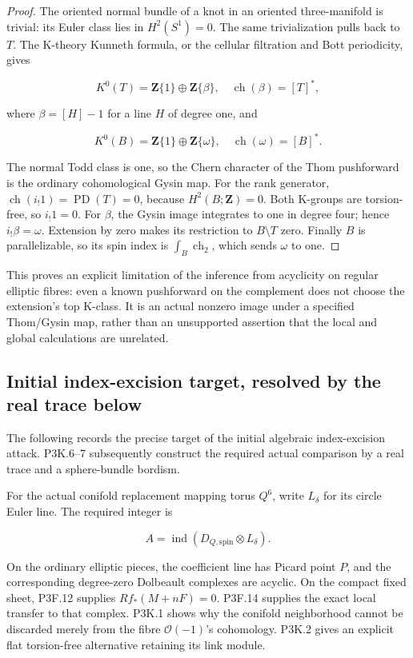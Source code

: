 \begin{proof}
The oriented normal bundle of a knot in an oriented
three-manifold is trivial: its Euler class lies in \(H^2(S^1)=0\).
The same trivialization pulls back to \(T\).  The K-theory Kunneth
formula, or the cellular filtration and Bott periodicity, gives

\[
 K^0(T)=\mathbf Z\{1\}\oplus\mathbf Z\{\beta\},\quad
 \operatorname{ch}(\beta)=[T]^*,
\]

where \(\beta=[H]-1\) for a line \(H\) of degree one, and

\[
 K^0(B)=\mathbf Z\{1\}\oplus\mathbf Z\{\omega\},\quad
 \operatorname{ch}(\omega)=[B]^*.
\]

The normal Todd class is one, so the Chern character of the Thom
pushforward is the ordinary cohomological Gysin map.  For the rank
generator, \(\operatorname{ch}(i_!1)=\operatorname{PD}(T)=0\), because
\(H^2(B;\mathbf Z)=0\).  Both K-groups are torsion-free, so \(i_!1=0\).
For \(\beta\), the Gysin image integrates to one in degree four;
hence \(i_!\beta=\omega\).  Extension by zero makes its restriction
to \(B\setminus T\) zero.  Finally \(B\) is parallelizable, so its
spin index is \(\int_B\operatorname{ch}_2\), which sends \(\omega\)
to one.
\end{proof}

This proves an explicit limitation of the inference from acyclicity
on regular elliptic fibres: even a known pushforward on the complement
does not choose the extension's top K-class.  It is an actual
nonzero image under a specified Thom/Gysin map, rather than an
unsupported assertion that the local and global calculations are
unrelated.

\subsection{Initial index-excision target, resolved by the real trace below}

The following records the precise target of the initial algebraic
index-excision attack.  P3K.6–7 subsequently construct the required
actual comparison by a real trace and a sphere-bundle bordism.

For the actual conifold replacement mapping torus \(Q^6\), write
\(L_\delta\) for its circle Euler line.  The required integer is

\[
 A=\operatorname{ind}(D_{Q,\mathrm{spin}}\otimes L_\delta).
\]

On the ordinary elliptic pieces, the coefficient line has Picard point
\(P\), and the corresponding degree-zero Dolbeault complexes are
acyclic.  On the compact fixed sheet, P3F.12 supplies
\(R f_*(M+nF)=0\).  P3F.14 supplies the exact local transfer to that
complex.  P3K.1 shows why the conifold neighborhood cannot be discarded
merely from the fibre \(\mathcal O(-1)\)'s cohomology.  P3K.2 gives an
explicit flat torsion-free alternative retaining its link module.

